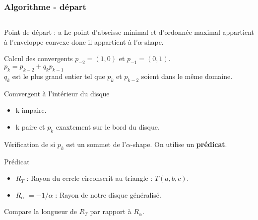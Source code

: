 \begin{frame}
\frametitle{Algorithme - départ}

\begin{columns}[t]
  \begin{column}{0.7\linewidth}
    {
      \begin{block}{Point de départ : a}
        Le point d'abscisse minimal et d'ordonnée maximal appartient à l'enveloppe convexe donc il appartient à l'$\alpha$-shape.\\
      \end{block}
    }
    {  
      \begin{block}{Calcul des convergents}
        $p_{-2} = (1,0)$ et $p_{-1} = (0,1)$.\\
        $p_{k} = p_{k-2} + q_k p_{k-1}$\\
        $q_k$ est le plus grand entier tel que $p_{k}$ et $p_{k-2}$ soient dans le même domaine.
      \end{block}
    }
    {
      \begin{block}{Comvergent à l'intérieur du disque}
        \begin{itemize}
          \item k impaire.
          \item k paire et $p_k$ exaxtement sur le bord du disque.
        \end{itemize}
        Vérification de si $p_k$ est un sommet de l'$\alpha$-shape.
        On utilise un \textbf{prédicat}.
      \end{block}
    }
    {
      \begin{block}{Prédicat}
      \begin{itemize}
        \item \textbf{$R_T$} : Rayon du cercle circonscrit au triangle : $T(a, b, c)$.
        \item \textbf{$R_{\alpha}$} $= -1/\alpha$ : Rayon de notre disque généralisé.
      \end{itemize}      
        Compare la longueur de \textbf{$R_T$} par rapport à \textbf{$R_{\alpha}$}.\\
      \end{block}
    }


\end{column}
\end{columns}
\end{frame}
